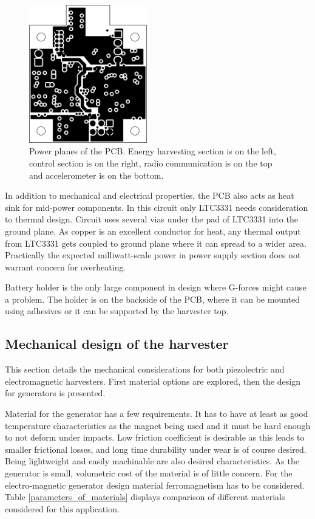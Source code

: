 \begin{figure}[htb]
  \begin{center}
    \includegraphics[height=6cm]{images/own_dwg/circuit/powerplane.jpg}
  \end{center}
  \caption{\label{fig:pcb_planes} Power planes of the PCB. Energy harvesting section is on the left, control section is on the right, radio communication is on the top and accelerometer is on the bottom.}
\end{figure}

In addition to mechanical and electrical properties, the PCB also acts as heat sink for mid-power components. In this circuit only LTC3331 needs consideration to thermal design. Circuit uses several vias under the pad of LTC3331 into the ground plane. As copper is an excellent conductor for heat, any thermal output from LTC3331 gets coupled to ground plane where it can spread to a wider area. Practically the expected milliwatt-scale power in power supply section does not warrant concern for overheating.

Battery holder is the only large component in design where G-forces might cause a problem. The holder is on the backside of the PCB, where it can be mounted using adhesives or it can be supported by the harvester top.

\subsection{Mechanical design of the harvester}
This section details the mechanical considerations for both piezolectric and electromagnetic harvesters. First material options are explored, then the design for generators is presented.

Material for the generator has a few requirements. It has to have at least as good temperature characteristics as the magnet being used and it must be hard enough to not deform under impacts. Low friction coefficient is desirable as this leads to smaller  frictional losses, and long time durability under wear is of course desired. Being lightweight and easily machinable are also desired characteristics. As the generator is small, volumetric cost of the material is of little concern. For the electro-magnetic generator design material ferromagnetism has to be considered. Table \ref{parameters_of_materials} displays comparison of different materials considered for this application.

